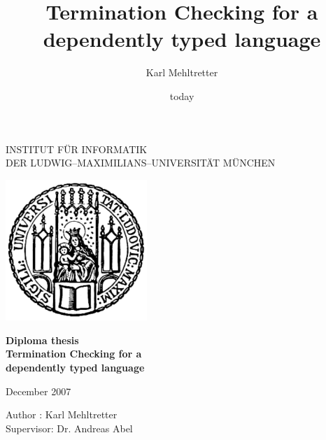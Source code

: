 \documentclass[a4paper,11pt]{report}
\begin{document}
\begin{titlepage}
\begin{center}


\vspace*{-2cm}

{\Huge INSTITUT F\"UR INFORMATIK\\[1mm]} %
DER LUDWIG--MAXIMILIANS--UNIVERSIT\"AT M\"UNCHEN\\

\vspace*{1cm}

\includegraphics[width=0.4\textwidth]{siegel.pdf}

\vspace*{2cm}

{\Large \textbf{Diploma thesis}}\\

\vspace{2.0cm}
{\Huge \textbf{Termination Checking for a}}\\
\vspace*{3mm}
{\Huge \textbf{dependently typed language}}\\

\vspace{2cm}

\large{December 2007}

\vspace{1.5cm}

  \begin{Large}
      Author : Karl Mehltretter\\
      Supervisor: Dr. Andreas Abel
  \end{Large}


\end{center}
\end{titlepage} 



\title{Termination Checking for a dependently typed language}
\author{Karl Mehltretter}
\date{today}
\end{document}
